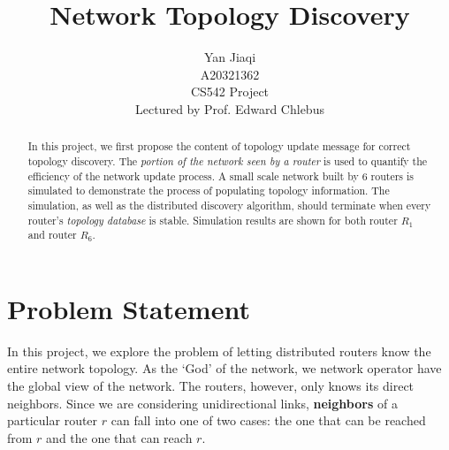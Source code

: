 \documentclass[12pt]{article}  %
\title{Network Topology Discovery}
\author{Yan Jiaqi\\
A20321362\\
CS542 Project\\
Lectured by Prof. Edward Chlebus}
\theoremstyle{definition}
\theoremstyle{remark}
\begin{document}
\maketitle

\begin{abstract}
In this project, we first propose the content of topology update message for correct topology discovery.
The \textit{portion of the network seen by a router} is used to quantify the efficiency of the network update process.
A small scale network built by 6 routers is simulated to demonstrate the process of populating topology information.
The simulation, as well as the distributed discovery algorithm, should terminate when every router's \textit{topology database} is stable.
Simulation results are shown for both router $R_1$ and router $R_6$.
\end{abstract}

\newpage                     %
\tableofcontents

\newpage                     %
\section{Problem Statement}\label{s:intro}
%

In this project, we explore the problem of letting distributed routers know the entire network topology.
As the `God' of the network, we network operator have the global view of the network.
The routers, however, only knows its direct neighbors.
Since we are considering unidirectional links, \textbf{neighbors} of a particular router $r$ can fall into one of two cases: the one that can be reached from $r$ and the one that can reach $r$.
\end{document}
